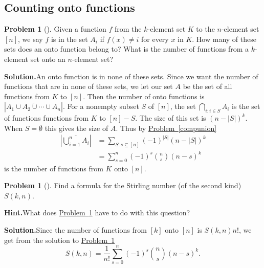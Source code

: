 \documentclass[10pt,]{book}
\theoremstyle{plain}
\theoremstyle{definition}
\newtheorem{activity}[project]{Problem}
\theoremstyle{definition}
\numberwithin{equation}{chapter}
\begin{document}
\subsection[{Counting onto functions}]{Counting onto functions}\label{subsection-48}
\begin{activity}[]\label{numontofun}
Given a function \(f\) from the \(k\)-element set \(K\) to the \(n\)-element set \([n]\), we say \(f\) is in the set \(A_i\) if \(f(x)\not= i\) for every \(x\) in \(K\). How many of these  sets does an onto function belong to? What is the number of functions from a \(k\)-element set onto an \(n\)-element set?%
\par\medskip\noindent%
\textbf{Solution.}\quad An onto function is in none of these sets. Since we want the number of functions that are in none of these sets, we let our set \(A\) be the set of all functions from \(K\) to \([n]\). Then the number of onto functions is \(|\overline{A_1\cup A_2\cup \cdots \cup A_n}|\). For a nonempty subset \(S\) of \([n]\), the set \(\bigcap_{i\colon i\in S} A_i\) is the set of functions functions from \(K\) to \([n]-S\). The size of this set is \((n-|S|)^k\). When \(S=\emptyset\) this gives the size of \(A\). Thus by \hyperref[compunion]{Problem~\ref{compunion}}%
\begin{align*}
\left|\overline{\bigcup_{i=1}^n A_i}\right|&=  \sum_{S:s\subseteq [n]} (-1)^{|S|}
(n-|S|)^k\\
&= \sum_{s=0}^n (-1)^s\binom{n}{s}(n-s)^k
\end{align*}
is the number of functions from \(K\) onto \([n]\).%
\end{activity}
\begin{activity}[]\label{activity-239}
Find a formula for the Stirling number (of the second kind) \(S(k,n)\).%
\par\medskip\noindent%
\textbf{Hint.}\quad What does \hyperref[numontofun]{Problem~\ref{numontofun}} have to do with this question?%
\par\medskip\noindent%
\textbf{Solution.}\quad Since the number of functions from \([k]\) onto \([n]\) is \(S(k,n)n!\), we get from the solution to \hyperref[numontofun]{Problem~\ref{numontofun}}%
\begin{equation*}
S(k,n) = \frac{1}{n!}\sum_{s=0}^n (-1)^s\binom{n}{s}(n-s)^k.
\end{equation*}
%
\end{activity}
\end{document}

